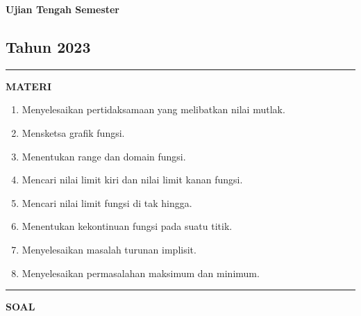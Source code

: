 \newpage
\begin{flushright}
    \textbf{\Large{Ujian Tengah Semester}}
    \subsection*{Tahun 2023}
\end{flushright}
\vspace{0.5cm}
\hrule height 2pt
\vspace{0.5cm}
\begin{center}
    \textbf{\large{MATERI}}
    \begin{enumerate}[leftmargin=*, label={\arabic*}.]
        \item Menyelesaikan pertidaksamaan yang melibatkan nilai mutlak.
        \item Mensketsa grafik fungsi.
        \item Menentukan range dan domain fungsi.
        \item Mencari nilai limit kiri dan nilai limit kanan fungsi.
        \item Mencari nilai limit fungsi di tak hingga.
        \item Menentukan kekontinuan fungsi pada suatu titik.
        \item Menyelesaikan masalah turunan implisit.
        \item Menyelesaikan permasalahan maksimum dan minimum.
    \end{enumerate}
\end{center}
\vspace{0.2cm}
\hrule height 1pt
\vspace{0.5cm}
\begin{center}
    \textbf{\large{SOAL}}
\end{center}
